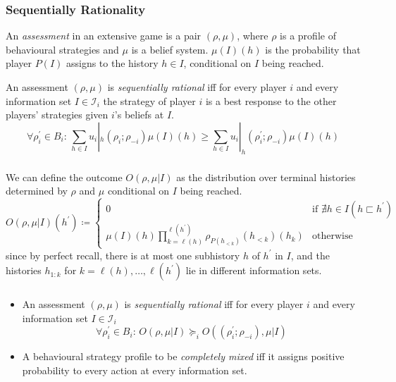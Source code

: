 \documentclass[UTF8,11pt,colorlinks,compress,openany]{beamer}%
\begin{document}
\begin{frame}\frametitle{Sequentially Rationality}
\begin{definition}[Assessment]
	An \emph{assessment} in an extensive game is a pair $(\rho,\mu)$, where $\rho$ is a profile of behavioural strategies and $\mu$ is a belief system. $\mu(I)(h)$ is the probability that player $P(I)$ assigns to the history $h\in I$, conditional on $I$ being reached.
\end{definition}
\begin{definition}
	An assessment $(\rho,\mu)$ is \emph{sequentially rational} iff for every player $i$ and every information set $I\in\mathcal{I}_i$ the strategy of player $i$ is a best response to the other players' strategies given $i$'s beliefs at $I$.
	\[\forall\rho_i^\prime\in B_i:\, \sum\limits_{h\in I}u_i|_h(\rho_i;\rho_{-i})\mu(I)(h)\geq\sum\limits_{h\in I}u_i|_h(\rho_i^\prime;\rho_{-i})\mu(I)(h)\]
\end{definition}
\end{frame}

\begin{frame}\frametitle{}
We can define the outcome $O(\rho,\mu|I)$ as the distribution over terminal histories determined by $\rho$ and $\mu$ conditional on $I$ being reached.
\[
O(\rho,\mu|I)(h^\prime)\coloneqq 
\begin{cases}
0 &\text{if $\nexists h\in I\left(h\sqsubset h^\prime\right)$}\\
\mu(I)(h)\prod\limits_{k=\ell(h)}^{\ell(h^\prime)}\rho_{P(h_{<k})}(h_{<k})(h_k) &\text{otherwise}
\end{cases}
\]
since by perfect recall, there is at most one subhistory $h$ of $h^\prime$ in $I$, and the histories $h_{1:k}$ for $k=\ell(h),\ldots,\ell(h^\prime)$ lie in different information sets.
\end{frame}

\begin{frame}\frametitle{}
\begin{itemize}
	\item An assessment $(\rho,\mu)$ is \emph{sequentially rational} iff for every player $i$ and every information set $I\in\mathcal{I}_i$
\[\forall \rho_i^\prime\in B_i:\, O(\rho,\mu|I)\succcurlyeq_i O((\rho_i^\prime;\rho_{-i}),\mu|I)\]
	\item A behavioural strategy profile to be \emph{\emph{completely mixed}} iff it assigns positive probability to every action at every information set.
\end{itemize}
\end{frame}
\end{document}
